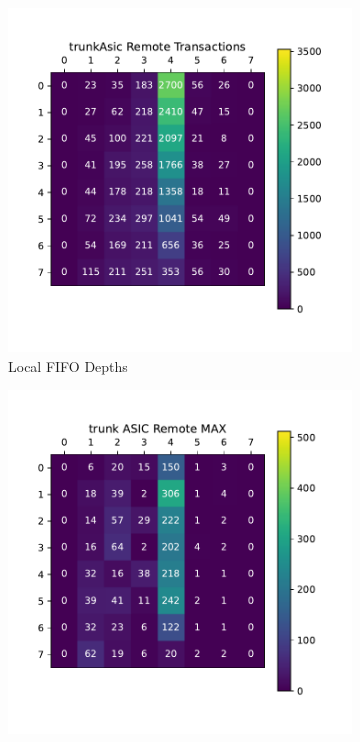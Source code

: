 \begin{figure}
\centering
\begin{subfigure}{.5\textwidth}
  \centering
  \includegraphics[width=\textwidth]{images/trunk_asic_trans.pdf}
  \caption{Local FIFO Depths}
\end{subfigure}%
\begin{subfigure}{.5\textwidth}
  \centering
  \includegraphics[width=\textwidth]{images/trunk_asic_remote.pdf}

\end{subfigure}
\end{figure}
